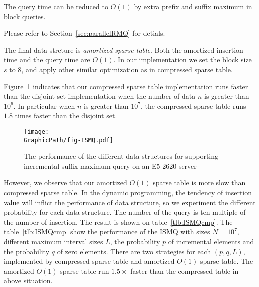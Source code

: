The query time can be reduced to $O(1)$ by extra prefix and suffix
maximum in block queries.

Please refer to Section~\ref{sec:parallelRMQ} for detials.

The final data strcture is {\em amortized sparse table}.  Both the
amortized insertion time and the query time are $O(1)$.  In our
implementation we set the block size $s$ to $8$, and apply other
similar optimization as in compressed sparse table.

\iffalse
\begin{itemize}
  \item 并查集 (Disjoint Set): 平均運行時間 $o(\alpha(n))$。只使用路徑壓縮技巧。
  \item 稀疏表 (Sparse Table): 插入 $O(\log n)$、詢問 $O(1)$。實作陣列宣告採用 $\tt{table}[\log N][N]$ 以減少快取未中。
  \item 樹狀數組 (Binary Indexed Tree): 插入、詢問均為 $O(\log n)$。
  \item 壓縮稀疏表 (Compressed Sparse Tree): 插入均攤 $O(1)$、詢問操作 $O(s)$，
  其中 $s$ 為拆分到區塊大小。實作時，維護區塊前綴和後綴最大值降低詢問複雜度至 $O(1)$，當發生 in-block 詢問再運行 $O(s)$ 算法。
\end{itemize}
\fi

Figure~\ref{fig:fig-ISMQcmp} indicates that our compressed sparse
table implementation runs faster than the disjoint set implementation
when the number of data $n$ is greater than $10^6$.  In particular
when $n$ is greater than $10^7$, the compressed sparse table runs
$1.8$ times faster than the disjoint set.

\begin{figure}[!thb]
  \centering
  \texttt{[image: \\GraphicPath/fig-ISMQ.pdf]}

  \caption{The performance of the different data structures for
    supporting incremental suffix maximum query on an E5-2620 server}
  \label{fig:fig-ISMQcmp}
\end{figure}

However, we observe that our amortized $O(1)$ sparse table is more
slow than compressed sparse table.  In the dynamic programming, the
tendency of insertion value will inflict the performance of data
structure, so we experiment the different probability for each data
structure.  The number of the query is ten multiple of the number of
insertion.  The result is shown on table~\ref{tlb:ISMQcmp}.  The
table~\ref{tlb:ISMQcmp} show the performance of the ISMQ with sizes $N
= 10^7$, different maximum interval sizes $L$, the probability $p$ of
incremental elements and the probability $q$ of zero elements. There
are two strategies for each $(p, q, L)$, implemented by compressed
sparse table and amortized $O(1)$ sparse table.  The amortized $O(1)$
sparse table run $1.5 \times$ faster than the compressed table in
above situation.

